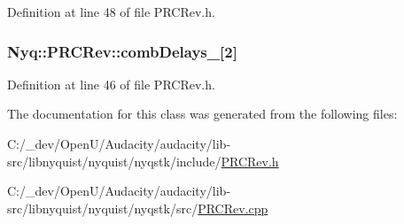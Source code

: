 Definition at line 48 of file P\+R\+C\+Rev.\+h.

\subsubsection[{\texorpdfstring{comb\+Delays\+\_\+}{combDelays_}}]{ Nyq\+::\+P\+R\+C\+Rev\+::comb\+Delays\+\_\+\mbox{[}2\mbox{]}\hspace{0.3cm}{\ttfamily [protected]}}\hypertarget{class_nyq_1_1_p_r_c_rev_aec6c008b05bd56f04a4990718a33d232}{}\label{class_nyq_1_1_p_r_c_rev_aec6c008b05bd56f04a4990718a33d232}


Definition at line 46 of file P\+R\+C\+Rev.\+h.



The documentation for this class was generated from the following files\+:\begin{DoxyCompactItemize}
\item 
C\+:/\+\_\+dev/\+Open\+U/\+Audacity/audacity/lib-\/src/libnyquist/nyquist/nyqstk/include/\hyperlink{_p_r_c_rev_8h}{P\+R\+C\+Rev.\+h}\item 
C\+:/\+\_\+dev/\+Open\+U/\+Audacity/audacity/lib-\/src/libnyquist/nyquist/nyqstk/src/\hyperlink{_p_r_c_rev_8cpp}{P\+R\+C\+Rev.\+cpp}\end{DoxyCompactItemize}
